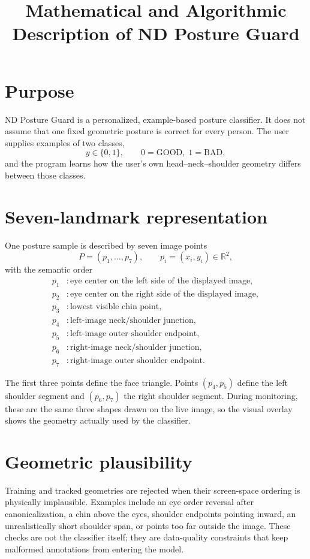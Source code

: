 \documentclass[11pt,a4paper]{article}
\title{Mathematical and Algorithmic Description of ND Posture Guard}
\author{}
\date{}
\begin{document}
\maketitle

\section{Purpose}

ND Posture Guard is a personalized, example-based posture classifier. It does
not assume that one fixed geometric posture is correct for every person. The
user supplies examples of two classes,
\[
y \in \{0,1\}, \qquad 0=\mathrm{GOOD},\;1=\mathrm{BAD},
\]
and the program learns how the user's own head--neck--shoulder geometry differs
between those classes.

\section{Seven-landmark representation}

One posture sample is described by seven image points
\[
P=(p_1,\ldots,p_7), \qquad p_i=(x_i,y_i)\in\mathbb{R}^2,
\]
with the semantic order
\begin{align*}
p_1 &: \text{eye center on the left side of the displayed image},\\
p_2 &: \text{eye center on the right side of the displayed image},\\
p_3 &: \text{lowest visible chin point},\\
p_4 &: \text{left-image neck/shoulder junction},\\
p_5 &: \text{left-image outer shoulder endpoint},\\
p_6 &: \text{right-image neck/shoulder junction},\\
p_7 &: \text{right-image outer shoulder endpoint}.
\end{align*}

The first three points define the face triangle. Points $(p_4,p_5)$ define the
left shoulder segment and $(p_6,p_7)$ the right shoulder segment. During
monitoring, these are the same three shapes drawn on the live image, so the
visual overlay shows the geometry actually used by the classifier.

\section{Geometric plausibility}

Training and tracked geometries are rejected when their screen-space ordering is
physically implausible. Examples include an eye order reversal after
canonicalization, a chin above the eyes, shoulder endpoints pointing inward, an
unrealistically short shoulder span, or points too far outside the image. These
checks are not the classifier itself; they are data-quality constraints that
keep malformed annotations from entering the model.
\end{document}

